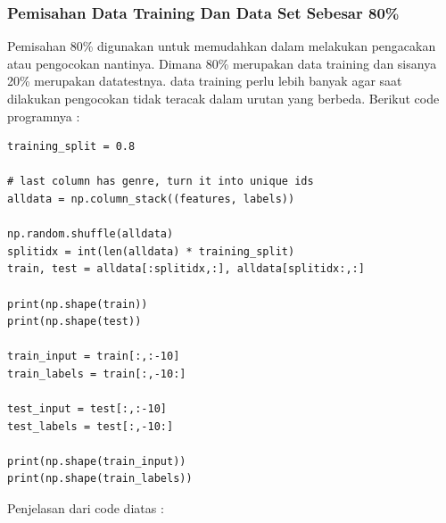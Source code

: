 \subsubsection{Pemisahan Data Training Dan Data Set Sebesar 80\%}
\par Pemisahan 80\% digunakan untuk memudahkan dalam melakukan pengacakan atau pengocokan nantinya. Dimana 80\% merupakan data training dan sisanya 20\% merupakan datatestnya. data training perlu lebih banyak agar saat dilakukan pengocokan tidak teracak dalam urutan yang berbeda. Berikut code programnya :
\begin{verbatim}
training_split = 0.8

# last column has genre, turn it into unique ids
alldata = np.column_stack((features, labels))

np.random.shuffle(alldata)
splitidx = int(len(alldata) * training_split)
train, test = alldata[:splitidx,:], alldata[splitidx:,:]

print(np.shape(train))
print(np.shape(test))

train_input = train[:,:-10]
train_labels = train[:,-10:]

test_input = test[:,:-10]
test_labels = test[:,-10:]

print(np.shape(train_input))
print(np.shape(train_labels))
\end{verbatim}
Penjelasan dari code diatas :
